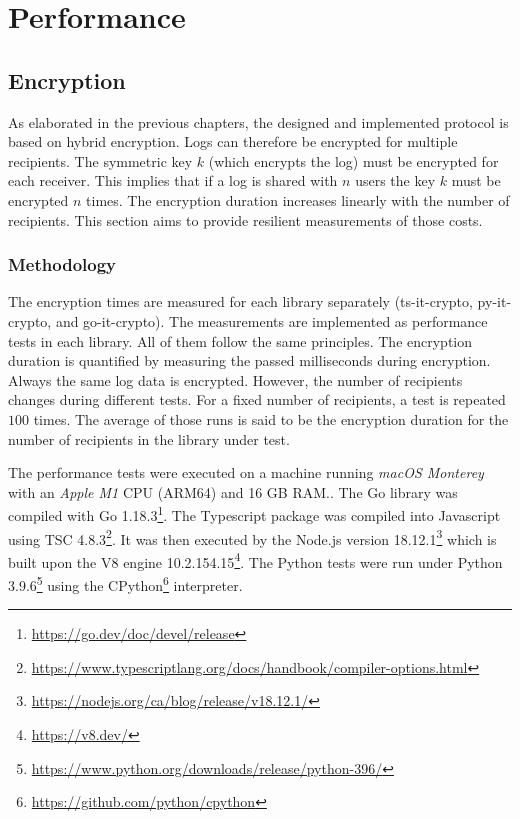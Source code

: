 \documentclass[../main.tex]{subfiles}
\begin{document}
\section{Performance}
\label{sec:evaluation-perf}

\subsection{Encryption}
As elaborated in the previous chapters, the designed and implemented protocol is based on hybrid encryption.
Logs can therefore  be encrypted for multiple recipients.
The symmetric key $k$ (which encrypts the log) must be encrypted for each receiver.
This implies that if a log is shared with $n$ users the key $k$ must be encrypted $n$ times.
The encryption duration increases linearly with the number of recipients.
This section aims to provide resilient measurements of those costs.

\subsubsection{Methodology}
The encryption times are measured for each library separately (ts-it-crypto, py-it-crypto, and go-it-crypto).
The measurements are implemented as performance tests in each library.
All of them follow the same principles.
The encryption duration is quantified by measuring the passed milliseconds during encryption.
Always the same log data is encrypted.
However, the number of recipients changes during different tests.
For a fixed number of recipients, a test is repeated $100$ times.
The average of those runs is said to be the encryption duration for the number of recipients in the library under test.

The performance tests were executed on a machine running \emph{macOS Monterey} with an \emph{Apple M1} CPU (ARM64) and 16 GB RAM..
The Go library was compiled with Go 1.18.3\footnote{\url{https://go.dev/doc/devel/release}}.
The Typescript package was compiled into Javascript using TSC 4.8.3\footnote{\url{https://www.typescriptlang.org/docs/handbook/compiler-options.html}}. 
It was then executed by the Node.js version 18.12.1\footnote{\url{https://nodejs.org/ca/blog/release/v18.12.1/}} which is built upon the V8 engine 10.2.154.15\footnote{\url{https://v8.dev/}}.
The Python tests were run under Python 3.9.6\footnote{\url{https://www.python.org/downloads/release/python-396/}} using the CPython\footnote{\url{https://github.com/python/cpython}} interpreter.
\end{document}
